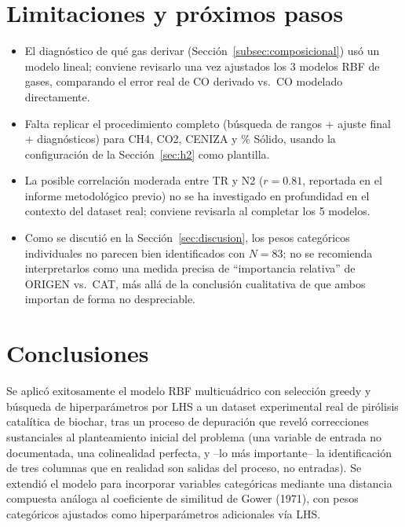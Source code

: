 \documentclass[11pt,a4paper]{article}
\begin{document}
\section{Limitaciones y pr\'oximos pasos}

\begin{itemize}
    \item El diagn\'ostico de qu\'e gas derivar (Secci\'on~\ref{subsec:composicional})
    us\'o un modelo lineal; conviene revisarlo una vez ajustados los 3
    modelos RBF de gases, comparando el error real de CO derivado vs.\ CO
    modelado directamente.
    \item Falta replicar el procedimiento completo (b\'usqueda de rangos +
    ajuste final + diagn\'osticos) para CH4, CO2, CENIZA y \% S\'olido,
    usando la configuraci\'on de la Secci\'on~\ref{sec:h2} como plantilla.
    \item La posible correlaci\'on moderada entre TR y N2 ($r=0.81$,
    reportada en el informe metodol\'ogico previo) no se ha investigado en
    profundidad en el contexto del dataset real; conviene revisarla al
    completar los 5 modelos.
    \item Como se discuti\'o en la Secci\'on~\ref{sec:discusion}, los pesos
    categ\'oricos individuales no parecen bien identificados con $N=83$; no
    se recomienda interpretarlos como una medida precisa de ``importancia
    relativa'' de ORIGEN vs.\ CAT, m\'as all\'a de la conclusi\'on cualitativa
    de que ambos importan de forma no despreciable.
\end{itemize}

\section{Conclusiones}

Se aplic\'o exitosamente el modelo RBF multicu\'adrico con selecci\'on
greedy y b\'usqueda de hiperpar\'ametros por LHS a un dataset experimental
real de pir\'olisis catal\'itica de biochar, tras un proceso de depuraci\'on
que revel\'o correcciones sustanciales al planteamiento inicial del problema
(una variable de entrada no documentada, una colinealidad perfecta, y --lo
m\'as importante-- la identificaci\'on de tres columnas que en realidad son
salidas del proceso, no entradas). Se extendi\'o el modelo para incorporar
variables categ\'oricas mediante una distancia compuesta an\'aloga al
coeficiente de similitud de Gower (1971), con pesos categ\'oricos ajustados
como hiperpar\'ametros adicionales v\'ia LHS.
\end{document}
